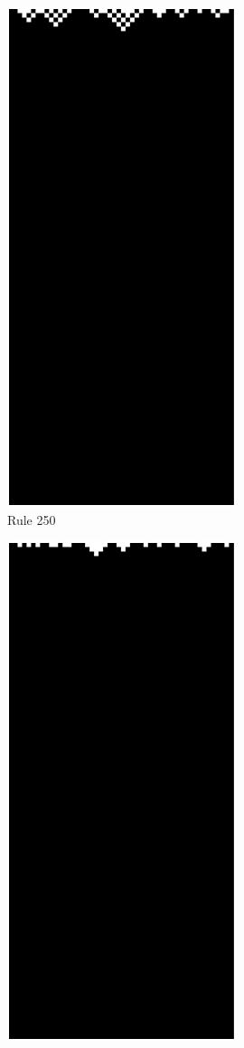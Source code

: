  \begin{figure}
 \caption[Example of elementry CA in Wolfram's four classes.]{Examples of Wolfram's class 1 (a,b),  2 (c,d), 3 (e,f) and 4 (g,h) elementary cellular automata}
 \label{class34}
\centering
    \begin{subfigure}[b]{0.25\textwidth}
		\centering
		\includegraphics[scale=0.32]{./images/CA_FDM/rule250}
   \caption[]{Rule 250}
   \end{subfigure}%
    \begin{subfigure}[b]{0.25\textwidth}
		\centering
		\includegraphics[scale=0.32]{./images/CA_FDM/rule254}

\end{subfigure}
\end{figure}
